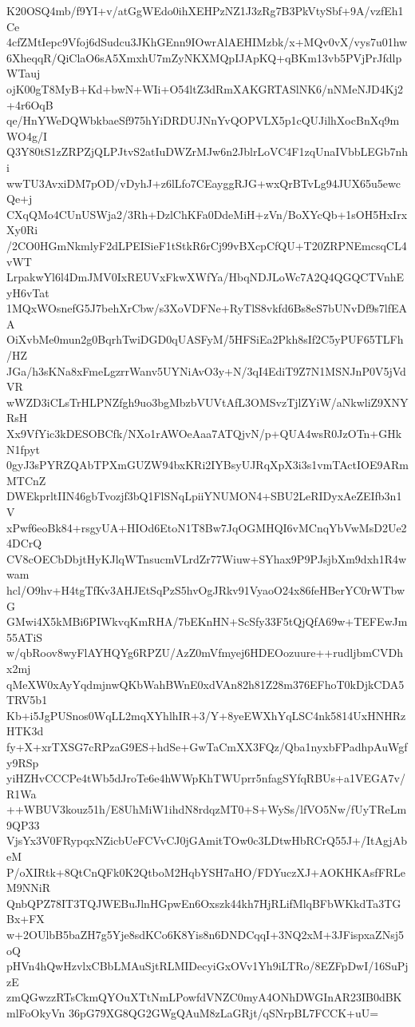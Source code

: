 K20OSQ4mb/f9YI+v/atGgWEdo0ihXEHPzNZ1J3zRg7B3PkVtySbf+9A/vzfEh1Ce
4cfZMtIepc9Vfoj6dSudcu3JKhGEnn9IOwrAlAEHIMzbk/x+MQv0vX/vys7u01hw
6XheqqR/QiClaO6sA5XmxhU7mZyNKXMQpIJApKQ+qBKm13vb5PVjPrJfdlpWTauj
ojK00gT8MyB+Kd+bwN+WIi+O54ltZ3dRmXAKGRTASlNK6/nNMeNJD4Kj2+4r6OqB
qe/HnYWeDQWbkbaeSf975hYiDRDUJNnYvQOPVLX5p1cQUJilhXocBnXq9mWO4g/I
Q3Y80tS1zZRPZjQLPJtvS2atIuDWZrMJw6n2JblrLoVC4F1zqUnaIVbbLEGb7nhi
wwTU3AvxiDM7pOD/vDyhJ+z6lLfo7CEayggRJG+wxQrBTvLg94JUX65u5ewcQe+j
CXqQMo4CUnUSWja2/3Rh+DzlChKFa0DdeMiH+zVn/BoXYcQb+1sOH5HxIrxXy0Ri
/2CO0HGmNkmlyF2dLPEISieF1tStkR6rCj99vBXcpCfQU+T20ZRPNEmcsqCL4vWT
LrpakwYl6l4DmJMV0IxREUVxFkwXWfYa/HbqNDJLoWc7A2Q4QGQCTVnhEyH6vTat
1MQxWOsnefG5J7behXrCbw/s3XoVDFNe+RyTlS8vkfd6Bs8eS7bUNvDf9s7lfEAA
OiXvbMe0mun2g0BqrhTwiDGD0qUASFyM/5HFSiEa2Pkh8sIf2C5yPUF65TLFh/HZ
JGa/h3sKNa8xFmeLgzrrWanv5UYNiAvO3y+N/3qI4EdiT9Z7N1MSNJnP0V5jVdVR
wWZD3iCLsTrHLPNZfgh9uo3bgMbzbVUVtAfL3OMSvzTjlZYiW/aNkwliZ9XNYRsH
Xx9VfYic3kDESOBCfk/NXo1rAWOeAaa7ATQjvN/p+QUA4wsR0JzOTn+GHkN1fpyt
0gyJ3sPYRZQAbTPXmGUZW94bxKRi2IYBsyUJRqXpX3i3s1vmTActIOE9ARmMTCnZ
DWEkprltIIN46gbTvozjf3bQ1FlSNqLpiiYNUMON4+SBU2LeRIDyxAeZEIfb3n1V
xPwf6eoBk84+rsgyUA+HIOd6EtoN1T8Bw7JqOGMHQI6vMCnqYbVwMsD2Ue24DCrQ
CV8cOECbDbjtHyKJlqWTnsucmVLrdZr77Wiuw+SYhax9P9PJsjbXm9dxh1R4wwam
hcl/O9hv+H4tgTfKv3AHJEtSqPzS5hvOgJRkv91VyaoO24x86feHBerYC0rWTbwG
GMwi4X5kMBi6PIWkvqKmRHA/7bEKnHN+ScSfy33F5tQjQfA69w+TEFEwJm55ATiS
w/qbRoov8wyFlAYHQYg6RPZU/AzZ0mVfmyej6HDEOozuure++rudljbmCVDhx2mj
qMeXW0xAyYqdmjnwQKbWahBWnE0xdVAn82h81Z28m376EFhoT0kDjkCDA5TRV5b1
Kb+i5JgPUSnos0WqLL2mqXYhlhIR+3/Y+8yeEWXhYqLSC4nk5814UxHNHRzHTK3d
fy+X+xrTXSG7cRPzaG9ES+hdSe+GwTaCmXX3FQz/Qba1nyxbFPadhpAuWgfy9RSp
yiHZHvCCCPe4tWb5dJroTe6e4hWWpKhTWUprr5nfagSYfqRBUs+a1VEGA7v/R1Wa
++WBUV3kouz51h/E8UhMiW1ihdN8rdqzMT0+S+WySs/lfVO5Nw/fUyTReLm9QP33
VjsYx3V0FRypqxNZicbUeFCVvCJ0jGAmitTOw0c3LDtwHbRCrQ55J+/ItAgjAbeM
P/oXIRtk+8QtCnQFk0K2QtboM2HqbYSH7aHO/FDYuczXJ+AOKHKAsfFRLeM9NNiR
QnbQPZ78IT3TQJWEBuJlnHGpwEn6Oxszk44kh7HjRLifMlqBFbWKkdTa3TGBx+FX
w+2OUlbB5baZH7g5Yje8sdKCo6K8Yis8n6DNDCqqI+3NQ2xM+3JFispxaZNsj5oQ
pHVn4hQwHzvlxCBbLMAuSjtRLMIDecyiGxOVv1Yh9iLTRo/8EZFpDwI/16SuPjzE
zmQGwzzRTsCkmQYOuXTtNmLPowfdVNZC0myA4ONhDWGInAR23IB0dBKmlFoOkyVn
36pG79XG8QG2GWgQAuM8zLaGRjt/qSNrpBL7FCCK+uU=
